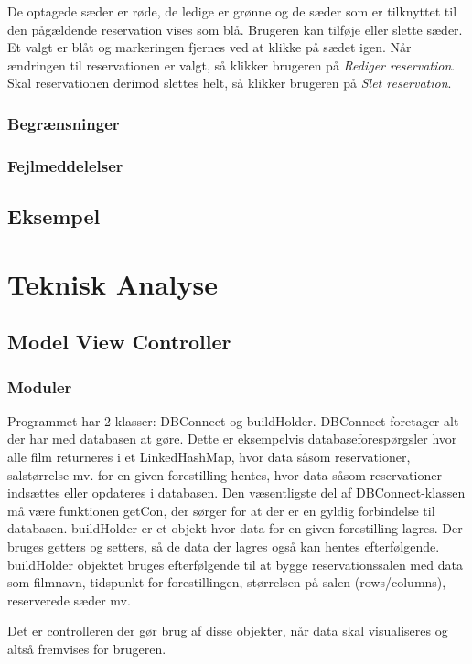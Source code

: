 \documentclass[final]{rapport1}
\begin{document}
De optagede sæder er røde, de ledige er grønne og de sæder som er tilknyttet til den pågældende reservation vises som blå. Brugeren kan tilføje eller slette sæder. Et valgt er blåt og markeringen fjernes ved at klikke på sædet igen. Når ændringen til reservationen er valgt, så klikker brugeren på \emph{Rediger reservation}. Skal reservationen derimod slettes helt, så klikker brugeren på \emph{Slet reservation}.

\subsection{Begrænsninger}
\subsection{Fejlmeddelelser}
\section{Eksempel}

\chapter{Teknisk Analyse}
\section{Model View Controller}

\subsection{Moduler}
Programmet har 2 klasser: DBConnect og buildHolder.
DBConnect foretager alt der har med databasen at gøre. Dette er eksempelvis databaseforespørgsler hvor alle film returneres i et LinkedHashMap, hvor data såsom reservationer, salstørrelse mv. for en given forestilling hentes, hvor data såsom reservationer indsættes eller opdateres i databasen. Den væsentligste del af DBConnect-klassen må være funktionen getCon, der sørger for at der er en gyldig forbindelse til databasen. 
buildHolder er et objekt hvor data for en given forestilling lagres. Der bruges getters og setters, så de data der lagres også kan hentes efterfølgende. buildHolder objektet bruges efterfølgende til at bygge reservationssalen med data som filmnavn, tidspunkt for forestillingen, størrelsen på salen (rows/columns), reserverede sæder mv. 

Det er controlleren der gør brug af disse objekter, når data skal visualiseres og altså fremvises for brugeren.
\end{document}
